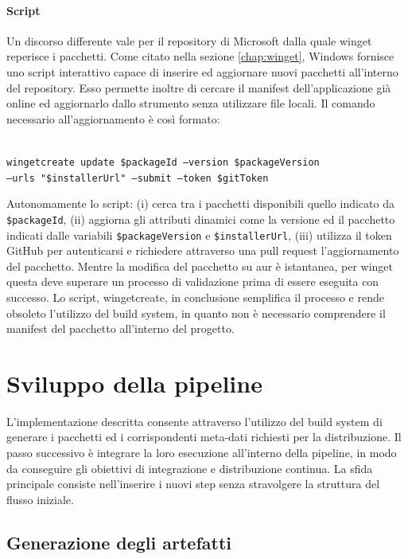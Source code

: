 \paragraph{Script} Un discorso differente vale per il repository di Microsoft dalla quale winget reperisce i pacchetti. Come citato nella sezione \ref{chap:winget}, Windows fornisce uno script interattivo capace di inserire ed aggiornare nuovi pacchetti all'interno del repository. Esso permette inoltre di cercare il manifest dell'applicazione già online ed aggiornarlo dallo strumento senza utilizzare file locali. Il comando necessario all'aggiornamento è così formato:

\texttt{\\wingetcreate update \$packageId --version \$packageVersion \\\tab\tab --urls "\$installerUrl" --submit --token \$gitToken}
\vspace{0.8cm}

Autonomamente lo script: (i) cerca tra i pacchetti disponibili quello indicato da \texttt{\$packageId}, (ii) aggiorna gli attributi dinamici come la versione ed il pacchetto indicati dalle variabili \texttt{\$packageVersion} e \texttt{\$installerUrl}, (iii) utilizza il token GitHub per autenticarsi e richiedere attraverso una pull request l'aggiornamento del pacchetto. Mentre la modifica del pacchetto su \ac{aur} è istantanea, per winget questa deve superare un processo di validazione prima di essere eseguita con successo. Lo script, wingetcreate, in conclusione semplifica il processo e rende obsoleto l'utilizzo del build system, in quanto non è necessario comprendere il manifest del pacchetto all'interno del progetto.

\section{Sviluppo della pipeline}

L'implementazione descritta consente attraverso l'utilizzo del build system di generare i pacchetti ed i corrispondenti meta-dati richiesti per la distribuzione. Il passo successivo è integrare la loro esecuzione all'interno della pipeline, in modo da conseguire gli obiettivi di integrazione e distribuzione continua. La sfida principale consiste nell'inserire i nuovi step senza stravolgere la struttura del flusso iniziale.

\subsection{Generazione degli artefatti}

